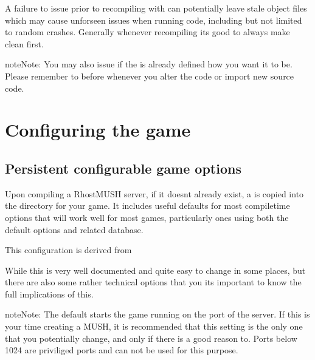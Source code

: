 \documentclass[letterpaper,10pt,english]{sphinxmanual}
\begin{document}
\sphinxAtStartPar
A failure to issue  prior to re\sphinxhyphen{}compiling with 
can potentially leave stale object files which may cause unforseen issues when
running code, including but not limited to random crashes.  Generally whenever
recompiling it\textquotesingle{}s good to always make clean first.

\begin{sphinxadmonition}{note}{Note:}
\sphinxAtStartPar
You may also issue  if the  is already defined how
you want it to be.  Please remember to  before 
whenever you alter the code or import new source code.
\end{sphinxadmonition}


\section{Configuring the game}
\label{\detokenize{install:configuring-the-game}}

\subsection{Persistent configurable game options}
\label{\detokenize{install:persistent-configurable-game-options}}
\sphinxAtStartPar
Upon compiling a RhostMUSH server, if it doesn\textquotesingle{}t already exist, a
 is copied into the  directory for your game. It
includes useful defaults for most compile\sphinxhyphen{}time options that will work well for
most games, particularly ones using both the default  options and
related database.

\sphinxAtStartPar
This configuration is derived from 

\sphinxAtStartPar
While this  is very well documented and quite easy to change
in some places, but there are also some rather technical options that you it\textquotesingle{}s
important to know the full implications of this.

\begin{sphinxadmonition}{note}{Note:}
\sphinxAtStartPar
The default  starts the game running on the port  of
the server. If this is your time creating a MUSH, it is recommended that this
setting is the only one that you potentially change, and only if there is a
good reason to. Ports below 1024 are priviliged ports and can not be used for
this purpose.
\end{sphinxadmonition}
\end{document}
